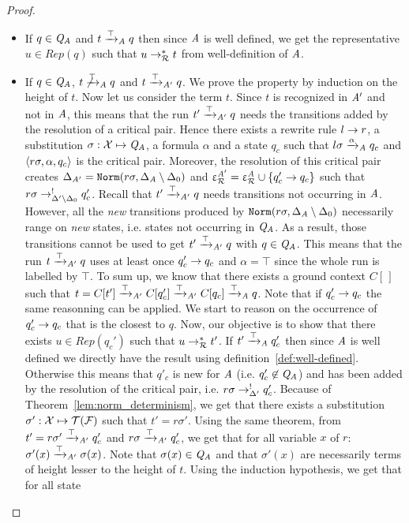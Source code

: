 \begin{proof}
\begin{enumerate}
\begin{itemize}
\item If $q\in\mathit Q_\mathit A$ and $t\xrightarrow{\top}_\mathit A q$ then since $\mathit A$ is well defined, we get the
  representative $u\in Rep(q)$ such that $u\rightarrow_\mathcal R^* t$ from well-definition of $\mathit A$.
\item If $q\in\mathit Q_\mathit A$, $t \not\xrightarrow{\top}_\mathit A q$ and $t \xrightarrow{\top}_{\mathit A'} q$. We prove the property by
induction on the height of $t$. Now let us consider the term $t$. Since $t$ is recognized
in $\mathit A'$ and not in $\mathit A$, this means that the run $t' \xrightarrow{\top}_{\mathit A'} q$ needs the
transitions added by the resolution of a critical pair. Hence there exists a
rewrite rule $l \rightarrow r$, a substitution $\sigma:\mathcal X \mapsto \mathit Q_\mathit A$, a formula
$\alpha$ and a state $q_c$ such that $l\sigma \xrightarrow{\alpha}_\mathit A q_c$ and $\langle
r\sigma, \alpha, q_c\rangle$ is the critical pair. Moreover, the resolution of this
critical pair creates $\Delta_{\mathit A'}=\mathtt{Norm}(r\sigma,\Delta_\mathit A\setminus \Delta_0)$
and $\upvarepsilon_{\mathcal R}^{\mathit A'}=\upvarepsilon_{\mathcal R}^{\mathit A} \cup \{q'_c \rightarrow q_c\}$ such that $r\sigma
\rightarrow^!_{\Delta'\setminus\Delta_0} q'_c$. Recall that $t' \xrightarrow{\top}_{\mathit A'} q$ needs transitions not occurring
in $\mathit A$. However, all the {\em new} transitions produced by
$\mathtt{Norm}(r\sigma,\Delta_\mathit A\setminus \Delta_0)$ necessarily range on {\em new}
states, i.e. states not occurring in $\mathit Q_\mathit A$. As a result, those transitions
cannot be used to get $t' \xrightarrow{\top}_{\mathit A'} q$ with $q\in\mathit Q_\mathit A$. This means that the run $t
\xrightarrow{\top}_{\mathit A'} q$ uses at least once $q'_c \rightarrow q_c$ and $\alpha=\top$ since the whole
run is labelled by $\top$. To sum up, we know that there exists a ground context
$C[\,]$ such that $t=C[t'] \xrightarrow{\top}_{\mathit A'} C[q'_c] \xrightarrow{\top}_{\mathit A'} C[q_c] \xrightarrow{\top}_\mathit A q$. Note that if
$q'_c \rightarrow q_c$ the same reasonning can be applied. We start to reason on the 
occurrence of $q'_c \rightarrow q_c$ that is the closest to $q$. Now, our
objective is to show that there exists $u\in Rep(q_c')$ such that $u \rightarrow_\mathcal R^*
t'$. If $t'\xrightarrow{\top}_\mathit A q'_c$ then since $\mathit A$ is well defined we directly have the
result using definition~\ref{def:well-defined}. Otherwise this means that $q'_c$
is new for $\mathit A$ (i.e. $q'_c\not\in\mathit Q_\mathit A$) and has been added by the resolution
of the critical pair, i.e. $r\sigma \rightarrow^!_{\Delta'} q'_c$. Because of
Theorem~\ref{lem:norm_determinism}, we get that there exists a substitution
$\sigma':\mathcal X \mapsto \mathcal{T(F)}$ such that $t'=r\sigma'$. Using the same theorem, from
$t'=r\sigma' \xrightarrow{\top}_{\mathit A'} q'_c$ and $r\sigma \xrightarrow{\top}_{\mathit A'} q'_c$, we get that for all
variable $x$ of $r$: $\sigma'(x) \xrightarrow{\top}_{\mathit A'} \sigma(x)$. Note that
$\sigma(x)\in\mathit Q_\mathit A$ and that $\sigma'(x)$ are necessarily terms of height lesser
to the height of $t$. Using the induction hypothesis, we get that for all state

\end{itemize}
\end{enumerate}
\end{proof}
